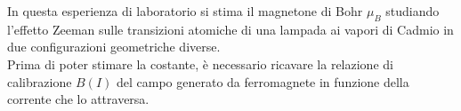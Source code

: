In questa esperienza di laboratorio si stima il magnetone di Bohr $\mu_B$ studiando l'effetto
Zeeman sulle transizioni atomiche di una lampada ai vapori di Cadmio in due configurazioni geometriche diverse.\\
Prima di poter stimare la costante, è necessario ricavare la relazione di calibrazione
$B(I)$ del campo generato da ferromagnete in funzione della corrente che lo attraversa.